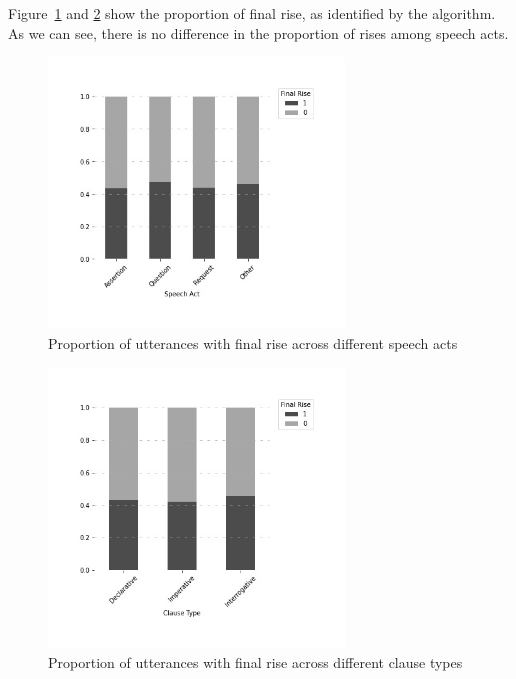 Figure~\ref{fig:rise-sp} and \ref{fig:rise-cl} show the proportion of final rise, as identified by the algorithm. As we can see, there is no difference in the proportion of rises among speech acts. 

\begin{figure}[H]
    \centering
    \includegraphics[width=0.7\textwidth]{figures/rise-sp.jpg}
    \caption{Proportion of utterances with final rise across different speech acts}
    \label{fig:rise-sp}
\end{figure}


\begin{figure}[H]
    \centering
    \includegraphics[width=0.7\textwidth]{figures/rise-cl.jpg}
    \caption{Proportion of utterances with final rise across different clause types}
    \label{fig:rise-cl}
\end{figure}


